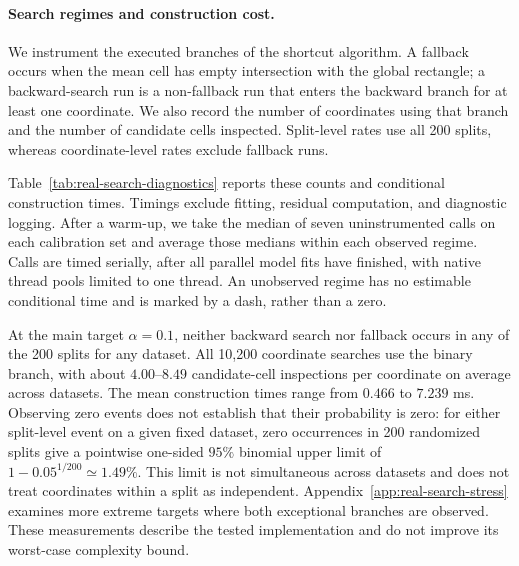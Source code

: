 \paragraph{Search regimes and construction cost.}
We instrument the executed branches of the shortcut algorithm. A fallback
occurs when the mean cell has empty intersection with the global rectangle;
a backward-search run is a non-fallback run that enters the backward branch
for at least one coordinate. We also record the number of coordinates using
that branch and the number of candidate cells inspected. Split-level rates
use all 200 splits, whereas coordinate-level rates exclude fallback runs.

Table~\ref{tab:real-search-diagnostics} reports these counts and conditional
construction times. Timings exclude fitting, residual computation, and
diagnostic logging. After a warm-up, we take the median of seven
uninstrumented calls on each calibration set and average those medians
within each observed regime. Calls are timed serially, after all parallel
model fits have finished, with native thread pools limited to one thread.
An unobserved regime has no estimable conditional time and is marked by a
dash, rather than a zero.

At the main target $\alpha=0.1$, neither backward search nor fallback occurs
in any of the 200 splits for any dataset. All 10,200 coordinate searches use
the binary branch, with about $4.00$--$8.49$ candidate-cell inspections per
coordinate on average across datasets. The mean construction times range
from $0.466$ to $7.239$ ms. Observing zero events does not establish that
their probability is zero: for either split-level event on a given fixed
dataset, zero occurrences in 200 randomized splits give a pointwise
one-sided $95\%$ binomial upper limit of
$1-0.05^{1/200}\simeq1.49\%$. This limit is not simultaneous across
datasets and does not treat coordinates within a split as independent.
Appendix~\ref{app:real-search-stress} examines more extreme targets where
both exceptional branches are observed. These measurements describe the
tested implementation and do not improve its worst-case complexity bound.

\begin{table}[!htbp]
  \centering
  \scriptsize
  \setlength{\tabcolsep}{3pt}
  
  \caption{Executed TSCP search regimes at target coverage $0.9$ on the
  six real datasets. Each split-count denominator is 200. The coordinate
  denominator is $d$ times the number of non-fallback splits. Conditional
  times summarize the full TSCP call, not just the backward loop; a dash
  denotes an unobserved regime. $n$ is the calibration size.}
  \label{tab:real-search-diagnostics}
\end{table}

